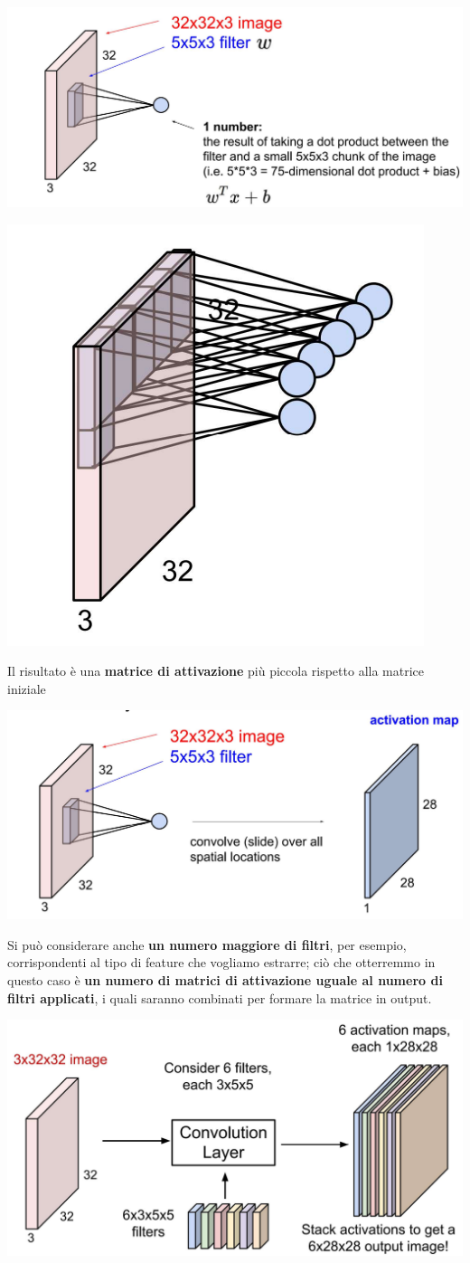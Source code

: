 \documentclass[12pt]{article}
\begin{document}
\begin{center}
    \includegraphics[width =0.90\linewidth]{Images/146.PNG}
\end{center}
\begin{center}
    \includegraphics[width =0.40\linewidth]{Images/147.PNG}
\end{center}
Il risultato è una \textbf{matrice di attivazione} più piccola rispetto alla matrice iniziale
\begin{center}
    \includegraphics[width =0.80\linewidth]{Images/148.PNG}
\end{center}
Si può considerare anche \textbf{un numero maggiore di filtri}, per esempio, corrispondenti al tipo di feature che vogliamo estrarre;
ciò che otterremmo in questo caso è \textbf{un numero di matrici di attivazione uguale al numero di filtri applicati}, i quali saranno combinati per formare la matrice in output.
\begin{center}
    \includegraphics[width =0.80\linewidth]{Images/149.PNG}
\end{center}
\end{document}
